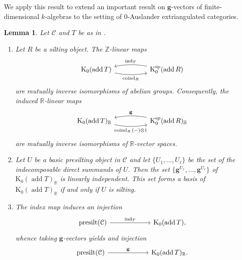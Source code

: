 \documentclass[10pt,twoside, a4paper,reqno]{amsart}
\DeclareMathOperator{\presilt}{presilt}
\DeclareMathOperator{\add}{add}
\DeclareMathOperator{\ind}{ind}
\DeclareMathOperator{\coind}{coind}
\newcommand{\R}{\mathbb{R}}
\newcommand{\calC}{\mathcal{C}}
\newcommand{\K}{\mathrm{K}}
\newcommand{\Ksp}{\mathrm{K}^{\mathrm{sp}}}
\newcommand{\bfg}{\mathbf{g}}
\newcommand{\Z}{\mathbb{Z}}
\newtheorem{lemma}[theorem]{Lemma}
\theoremstyle{definition}
\begin{document}
We apply this result to extend an important result on $\bfg$-vectors \cite{DK08, DIJ2019} of finite-dimensional $k$-algebras to the setting of 0-Auslander extriangulated categories. 

\begin{lemma}\label{lem:IsFan}
    Let $\calC$ and $T$ be as in .
    \begin{enumerate}
        \item\label{lem:IsFan_GNP} Let $R$ be a silting object.
        The $\Z$-linear maps
        \begin{equation*}
            \begin{tikzcd}
        \K_0(\add{T}) \arrow[rr, "\coind_R"', bend right=10] &  & \Ksp_0(\add{R}) \arrow[ll, "\ind_T"', bend right=10]
        \end{tikzcd} 
        \end{equation*}
        are mutually inverse isomorphisms of abelian groups. Consequently, the induced $\R$-linear maps
        \begin{equation}\label{eq:g_coind}
            \begin{tikzcd}
        \K_0(\add{T})_{\R} \arrow[rr, "\coind_R{(-)} \otimes {1}"', bend right=10] &  & \Ksp_0(\add{R})_{\R} \arrow[ll, "\bfg"', bend right=10]
        \end{tikzcd} 
        \end{equation}
        are mutually inverse isomorphisms of $\R$-vector spaces.
        \item\label{lem:IsFan_linindep} Let $U$ be a basic presilting object in $\calC$ and let $\{U_1,\dots,U_{\ell}\}$ be the set of the indecomposable direct summands of $U$. Then the set 
    $\{ \bfg^{U_1}, \dots, \bfg^{U_\ell}\}$ of ${\K}_0(\add{T})_{\R}$ is linearly independent. This set forms a basis of ${\K}_0(\add{T})_{\R}$ if and only if $U$ is silting.
    \item\label{lem:IsFan_inj} {The index map induces an injection}
    \begin{equation}\label{eq:IsFan_inj_ind}
    \begin{tikzcd}[column sep=6em]
        \presilt(\calC) \arrow[r, "\ind_T"] & \K_0(\add{T}),
        \end{tikzcd}
    \end{equation}
    {whence taking $\bfg$-vectors yields and injection}
     \begin{equation*}
    \begin{tikzcd}[column sep=6em]
        \presilt(\calC) \arrow[r, "\bfg"] & \K_0(\add{T})_{\R}.
        \end{tikzcd}
    \end{equation*}
    \end{enumerate}
\end{lemma}
\end{document}
